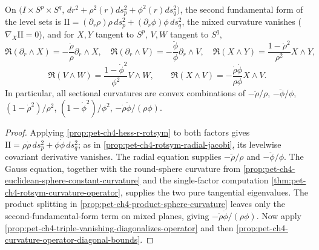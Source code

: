 \begin{theorem}
  \label{thm:pet-ch4-doubly-warped-curvature}
  On $\big(I\times S^p\times S^q,\,dr^2+\rho^2(r)ds_p^2+\phi^2(r)ds_q^2\big)$, the
  second fundamental form of the level sets is
  $\mathrm{II}=(\partial_r\rho)\rho\,ds_p^2+(\partial_r\phi)\phi\,ds_q^2$, the mixed
  curvature vanishes ($\nabla_X\mathrm{II}=0$), and for $X,Y$ tangent to $S^p$,
  $V,W$ tangent to $S^q$,
  \[
    \mathfrak{R}(\partial_r\wedge X)=-\frac{\ddot\rho}\rho\partial_r\wedge X,\quad
    \mathfrak{R}(\partial_r\wedge V)=-\frac{\ddot\phi}\phi\partial_r\wedge V,\quad
    \mathfrak{R}(X\wedge Y)=\frac{1-\dot\rho^2}{\rho^2}X\wedge Y,
  \]
  \[
    \mathfrak{R}(V\wedge W)=\frac{1-\dot\phi^2}{\phi^2}V\wedge W,\qquad
    \mathfrak{R}(X\wedge V)=-\frac{\dot\rho\dot\phi}{\rho\phi}X\wedge V.
  \]
  In particular, all sectional curvatures are convex combinations of
  $-\ddot\rho/\rho$, $-\ddot\phi/\phi$, $(1-\dot\rho^2)/\rho^2$,
  $(1-\dot\phi^2)/\phi^2$, $-\dot\rho\dot\phi/(\rho\phi)$.
\end{theorem}
\begin{proof}
  \sketch
  Applying \cref{prop:pet-ch4-hess-r-rotsym} to both factors gives
  $\mathrm{II}=\rho\dot\rho\,ds_p^2+\phi\dot\phi\,ds_q^2$; as in
  \cref{prop:pet-ch4-rotsym-radial-jacobi}, its levelwise covariant derivative
  vanishes. The radial equation supplies $-\ddot\rho/\rho$ and
  $-\ddot\phi/\phi$. The Gauss equation, together with the round-sphere
  curvature from \cref{prop:pet-ch4-euclidean-sphere-constant-curvature} and
  the single-factor computation \cref{thm:pet-ch4-rotsym-curvature-operator},
  supplies the two pure tangential eigenvalues. The product splitting in
  \cref{prop:pet-ch4-product-sphere-curvature} leaves only the second-fundamental-form
  term on mixed planes, giving $-\dot\rho\dot\phi/(\rho\phi)$. Now apply
  \cref{prop:pet-ch4-triple-vanishing-diagonalizes-operator} and then
  \cref{prop:pet-ch4-curvature-operator-diagonal-bounds}.
\end{proof}

